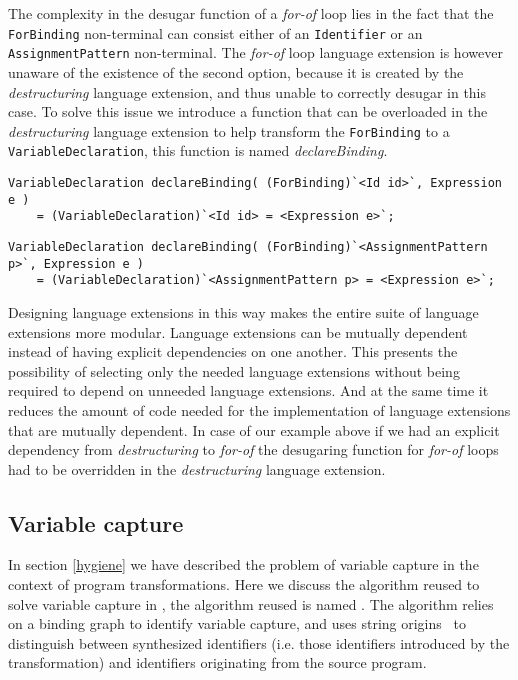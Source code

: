 The complexity in the desugar function of a \textit{for-of} loop lies in the fact that the \lstinline$ForBinding$ non-terminal can consist either of an \lstinline$Identifier$ or an \lstinline$AssignmentPattern$ non-terminal. The \textit{for-of} loop language extension is however unaware of the existence of the second option, because it is created by the \textit{destructuring} language extension, and thus unable to correctly desugar in this case. To solve this issue we introduce a function that can be overloaded in the \textit{destructuring} language extension to help transform the \lstinline$ForBinding$ to a \lstinline$VariableDeclaration$, this function is named \textit{declareBinding}.

\begin{lstlisting}[caption=default \textit{declareBinding} function from \textit{for-of} language extension,language=rascal]
VariableDeclaration declareBinding( (ForBinding)`<Id id>`, Expression e )
	= (VariableDeclaration)`<Id id> = <Expression e>`;
\end{lstlisting}

\begin{lstlisting}[caption=overloaded \textit{declareBinding} function from \textit{destructuring} language extension,language=rascal]
VariableDeclaration declareBinding( (ForBinding)`<AssignmentPattern p>`, Expression e )
	= (VariableDeclaration)`<AssignmentPattern p> = <Expression e>`;
\end{lstlisting}

Designing language extensions in this way makes the entire suite of language extensions more modular. Language extensions can be mutually dependent instead of having explicit dependencies on one another. This presents the possibility of selecting only the needed language extensions without being required to depend on unneeded language extensions. And at the same time it reduces the amount of code needed for the implementation of language extensions that are mutually dependent. In case of our example above if we had an explicit dependency from \textit{destructuring} to \textit{for-of} the desugaring function for \textit{for-of} loops had to be overridden in the \textit{destructuring} language extension.

\subsection{Variable capture}
In section \ref{hygiene} we have described the problem of variable capture in the context of program transformations. 
Here we discuss the algorithm reused to solve variable capture in \projectname, the algorithm reused is named \textit{\vfix}. The algorithm relies on a binding graph to identify variable capture, and uses string origins~\cite{Inostroza2014} to distinguish between synthesized identifiers (i.e. those identifiers introduced by the transformation) and identifiers originating from the source program.

